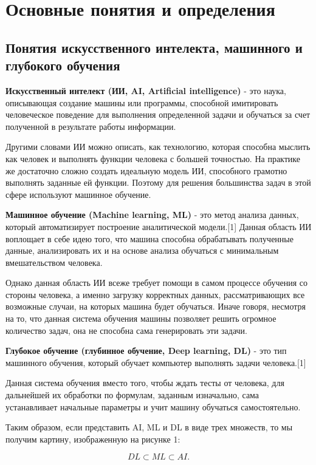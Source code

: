 \documentclass[bachelor, och, coursework]{shiza}
\begin{document}
\section{Основные понятия и определения}

\subsection{Понятия искусственного интелекта, машинного и глубокого обучения}

\textbf{Искусственный интелект (ИИ, AI, Artificial intelligence)} - это наука, описывающая создание машины или программы,
способной имитировать человеческое поведение для выполнения определенной задачи и обучаться за счет полученной в результате
работы информации.

Другими словами ИИ можно описать, как технологию, которая способна мыслить как человек и выполнять функции человека с большей
точностью. На практике же достаточно сложно создать идеальную модель ИИ, способного грамотно выполнять заданные ей функции. 
Поэтому для решения большинства задач в этой сфере используют машинное обучение.

\textbf{Машинное обучение (Machine learning, ML)} - это метод анализа данных, который автоматизирует построение аналитической 
модели.[1] Данная область ИИ воплощает в себе идею того, что машина способна обрабатывать полученные данные, анализировать их 
и на основе анализа обучаться с минимальным вмешательством человека.

Однако данная область ИИ всеже требует помощи в самом процессе обучения со стороны человека, а именно загрузку корректных данных,
рассматривающих все возможные случаи, на которых машина будет обучаться. Иначе говоря, несмотря на то, что данная система обучения
машины позволяет решить огромное количество задач, она не способна сама генерировать эти задачи.

\textbf{Глубокое обучение (глубинное обучение, Deep learning, DL)} - это тип машинного обучения, который обучает компьютер выполнять 
задачи человека.[1]

Данная система обучения вместо того, чтобы ждать тесты от человека, для дальнейшей их обработки по формулам, заданным изначально,
сама устанавливает начальные параметры и учит машину обучаться самостоятельно.

Таким образом, если представить AI, ML и DL в виде трех множеств, то мы получим картину, изображенную на рисунке 1:

\begin{equation}
    DL \subset ML \subset AI. 
\end{equation}
\end{document}

